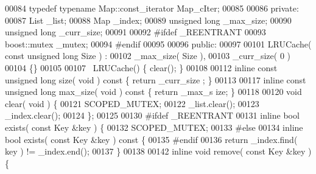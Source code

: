 \begin{DoxyCode}
00084                 \textcolor{keyword}{typedef} \textcolor{keyword}{typename} Map::const\_iterator Map\_cIter;           
00085 
00086         \textcolor{keyword}{private}:
00087                 List \_list;               
00088                 Map \_index;               
00089                 \textcolor{keywordtype}{unsigned} \textcolor{keywordtype}{long} \_max\_size;  
00090                 \textcolor{keywordtype}{unsigned} \textcolor{keywordtype}{long} \_curr\_size; 
00091 
00092 \textcolor{preprocessor}{#ifdef \_REENTRANT}
00093 \textcolor{preprocessor}{}                boost::mutex \_mutex;
00094 \textcolor{preprocessor}{#endif}
00095 \textcolor{preprocessor}{}
00096         \textcolor{keyword}{public}:
00097 
00101                 LRUCache( \textcolor{keyword}{const} \textcolor{keywordtype}{unsigned} \textcolor{keywordtype}{long} Size ) :
00102                                 \_max\_size( Size ),
00103                                 \_curr\_size( 0 )
00104                                 \{\}
00105 
00107                 ~LRUCache() \{ clear(); \}
00108 
00112                 \textcolor{keyword}{inline} \textcolor{keyword}{const} \textcolor{keywordtype}{unsigned} \textcolor{keywordtype}{long} size( \textcolor{keywordtype}{void} )\textcolor{keyword}{ const }\{ \textcolor{keywordflow}{return} \_curr\_size
      ; \}
00113 
00117                 \textcolor{keyword}{inline} \textcolor{keyword}{const} \textcolor{keywordtype}{unsigned} \textcolor{keywordtype}{long} max_size( \textcolor{keywordtype}{void} )\textcolor{keyword}{ const }\{ \textcolor{keywordflow}{return} \_max\_s
      ize; \}
00118 
00120                 \textcolor{keywordtype}{void} clear( \textcolor{keywordtype}{void} ) \{
00121                         SCOPED\_MUTEX;
00122                         \_list.clear();
00123                         \_index.clear();
00124                 \};
00125 
00130 \textcolor{preprocessor}{#ifdef \_REENTRANT}
00131 \textcolor{preprocessor}{}                \textcolor{keyword}{inline} \textcolor{keywordtype}{bool} exists( \textcolor{keyword}{const} Key &key ) \{
00132                         SCOPED\_MUTEX;
00133 \textcolor{preprocessor}{#else}
00134 \textcolor{preprocessor}{}                \textcolor{keyword}{inline} \textcolor{keywordtype}{bool} exists( \textcolor{keyword}{const} Key &key )\textcolor{keyword}{ const }\{
00135 \textcolor{preprocessor}{#endif}
00136 \textcolor{preprocessor}{}                        \textcolor{keywordflow}{return} \_index.find( key ) != \_index.end();
00137                 \}
00138 
00142                 \textcolor{keyword}{inline} \textcolor{keywordtype}{void} \textcolor{keyword}{remove}( \textcolor{keyword}{const} Key &key ) \{

\end{DoxyCode}
